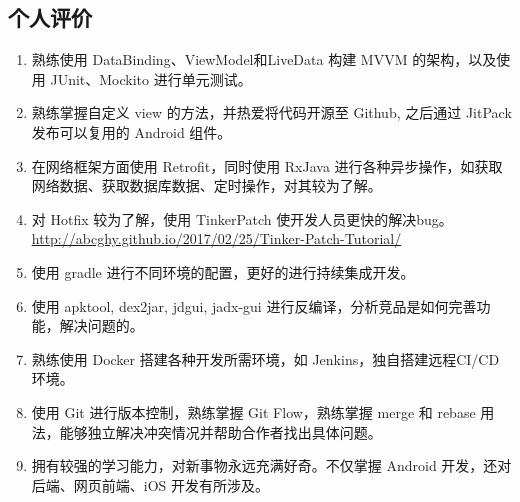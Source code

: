 \documentclass[11pt]{res}
\begin{document}
\begin{resume}
\section{个人评价}
  \begin{enumerate}
      \item 熟练使用 DataBinding、ViewModel和LiveData 构建 MVVM 的架构，以及使用 JUnit、Mockito 进行单元测试。
      \item 熟练掌握自定义 view 的方法，并热爱将代码开源至 Github, 之后通过 JitPack 发布可以复用的 Android 组件。
      \item 在网络框架方面使用 Retrofit，同时使用 RxJava 进行各种异步操作，如获取网络数据、获取数据库数据、定时操作，对其较为了解。
      \item 对 Hotfix 较为了解，使用 TinkerPatch 使开发人员更快的解决bug。\\ \url{http://abcghy.github.io/2017/02/25/Tinker-Patch-Tutorial/}
      \item 使用 gradle 进行不同环境的配置，更好的进行持续集成开发。
      \item 使用 apktool, dex2jar, jdgui, jadx-gui 进行反编译，分析竞品是如何完善功能，解决问题的。
      \item 熟练使用 Docker 搭建各种开发所需环境，如 Jenkins，独自搭建远程CI/CD环境。
      \item 使用 Git 进行版本控制，熟练掌握 Git Flow，熟练掌握 merge 和 rebase 用法，能够独立解决冲突情况并帮助合作者找出具体问题。
      \item 拥有较强的学习能力，对新事物永远充满好奇。不仅掌握 Android 开发，还对后端、网页前端、iOS 开发有所涉及。
  \end{enumerate}

\end{resume}
\end{document}
